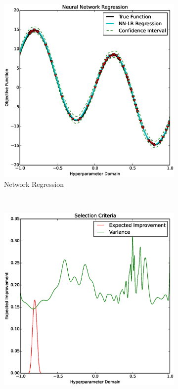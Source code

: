 \documentclass[]{article}
\newcommand{\1}{\mathbf{1}}
\newcommand{\0}{\mathbf{0}}
\begin{document}
\begin{figure}
\centering
\begin{subfigure}[b]{0.3\textwidth}
	\includegraphics[width=\textwidth]{images/regression.eps}
    \caption{Network Regression}
 	\label{fig:regr}
\end{subfigure}
~ 
\begin{subfigure}[b]{0.3\textwidth}
	\includegraphics[width=\textwidth]{images/expected_improvement.eps}

\end{subfigure}
\end{figure}
\end{document}
